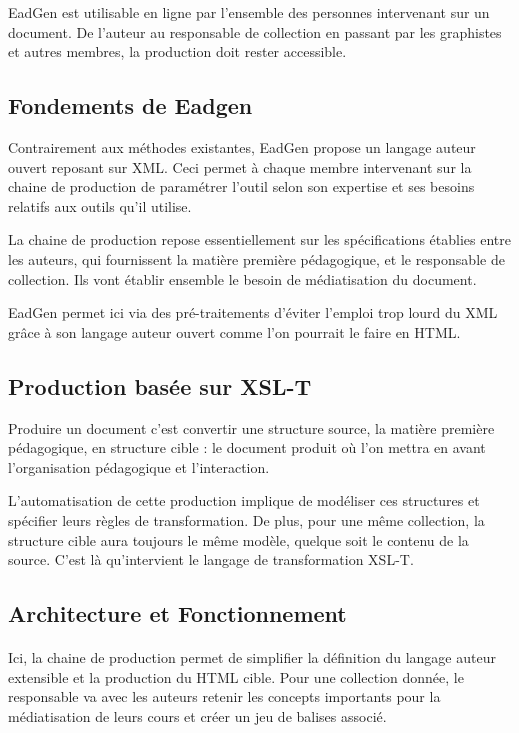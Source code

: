 EadGen est utilisable en ligne par l'ensemble des personnes intervenant sur un document. De l'auteur au responsable de collection en passant par les graphistes et autres membres, la production doit rester accessible.

\subsection{Fondements de Eadgen}

Contrairement aux méthodes existantes, EadGen propose un langage auteur ouvert reposant sur XML. Ceci permet à chaque membre intervenant sur la chaine de production de paramétrer l'outil selon son expertise et ses besoins relatifs aux outils qu'il utilise.

La chaine de production repose essentiellement sur les spécifications établies entre les auteurs, qui fournissent la matière première pédagogique, et le responsable de collection. Ils vont établir ensemble le besoin de médiatisation du document.

EadGen permet ici via des pré-traitements d'éviter l'emploi trop lourd du XML grâce à son langage auteur ouvert comme l'on pourrait le faire en HTML.

\subsection{Production basée sur XSL-T}

Produire un document c'est convertir une structure source, la matière première pédagogique, en structure cible : le document produit où l'on mettra en avant l'organisation pédagogique et l'interaction.

L'automatisation de cette production implique de modéliser ces structures et spécifier leurs règles de transformation. De plus, pour une même collection, la structure cible aura toujours le même modèle, quelque soit le contenu de la source. C'est là qu'intervient le langage de transformation XSL-T.

\subsection{Architecture et Fonctionnement}

\paragraph{}
Ici, la chaine de production permet de simplifier la définition du langage auteur extensible et la production du HTML cible. Pour une collection donnée, le responsable va avec les auteurs retenir les concepts importants pour la médiatisation de leurs cours et créer un jeu de balises associé.

